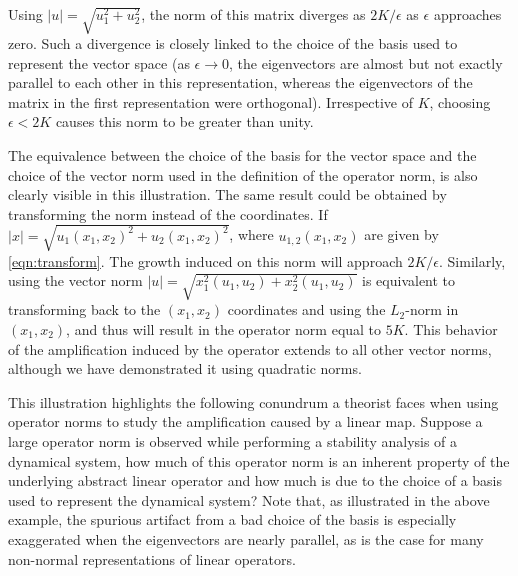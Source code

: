 \documentclass[letterpaper,10pt,prl,twocolumn,aps,reprint,superscriptaddress]{revtex4-1}
\begin{document}
Using $|u| = \sqrt{u_1^2 + u_2^2}$, the norm of this matrix diverges as $2K/\epsilon$ as $\epsilon$ approaches zero. Such a divergence is closely linked to the choice of the basis used to represent the vector space (as $\epsilon\to 0$, the eigenvectors are almost but not exactly parallel to each other in this representation, whereas the eigenvectors of the matrix in the first representation were orthogonal). Irrespective of $K$, choosing $\epsilon < 2K$ causes this norm to be greater than unity. 

The equivalence between the choice of the basis for the vector space and the choice of the vector norm used in the definition of the operator norm, is also clearly visible in this illustration. The same result could be obtained by transforming the norm instead of the coordinates. If $|x| = \sqrt{u_1(x_1,x_2)^2 + u_2(x_1,x_2)^2}$, where $u_{1,2}(x_1, x_2)$ are given by \eqref{eqn:transform}. The growth induced on this norm will approach $2K/\epsilon$. Similarly, using the vector norm $|u| = \sqrt{x_1^2(u_1,u_2)+x_2^2(u_1,u_2)}$ is equivalent to transforming back to the $(x_1, x_2)$ coordinates and using the $L_2$-norm in $(x_1, x_2)$, and thus will result in the operator norm equal to $5K$. This behavior of the amplification induced by the operator extends to all other vector norms, although we have demonstrated it using quadratic norms.

This illustration highlights the following conundrum a theorist faces when using operator norms to study the amplification caused by a linear map. Suppose a large operator norm is observed while performing a stability analysis of a dynamical system, how much of this operator norm is an inherent property of the underlying abstract linear operator and how much is due to the choice of a basis used to represent the dynamical system? Note that, as illustrated in the above example, the spurious artifact from a bad choice of the basis is especially exaggerated when the eigenvectors are nearly parallel, as is the case for many non-normal representations of linear operators.
\end{document}

